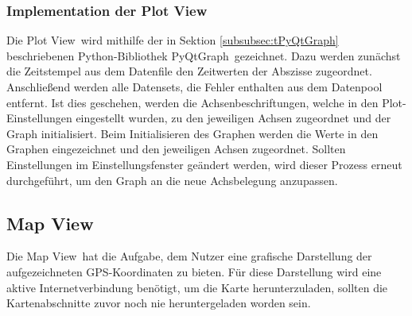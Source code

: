\subsubsection{Implementation der Plot View}
\label{subsubsec:PlotViewImplementation}
Die \glqq Plot View\grqq\ wird mithilfe der in Sektion \ref{subsubsec:tPyQtGraph} beschriebenen Python-Bibliothek \glqq PyQtGraph\grqq \ gezeichnet. Dazu werden zunächst die Zeitstempel aus dem Datenfile den Zeitwerten der Abszisse zugeordnet. Anschließend werden alle Datensets, die Fehler enthalten aus dem Datenpool entfernt. Ist dies geschehen, werden die Achsenbeschriftungen, welche in den Plot-Einstellungen eingestellt wurden, zu den jeweiligen Achsen zugeordnet und der Graph initialisiert. Beim Initialisieren des Graphen werden die Werte in den Graphen eingezeichnet und den jeweiligen Achsen zugeordnet. Sollten Einstellungen im Einstellungsfenster geändert werden, wird dieser Prozess erneut durchgeführt, um den Graph an die neue Achsbelegung anzupassen.
\subsection{Map View}
\label{subsec:VisMapView}
Die \glqq Map View\grqq\ hat die Aufgabe, dem Nutzer eine grafische Darstellung der aufgezeichneten \ac{GPS}-Koordinaten zu bieten. Für diese Darstellung wird eine aktive Internetverbindung benötigt, um die Karte herunterzuladen, sollten die Kartenabschnitte zuvor noch nie heruntergeladen worden sein.
